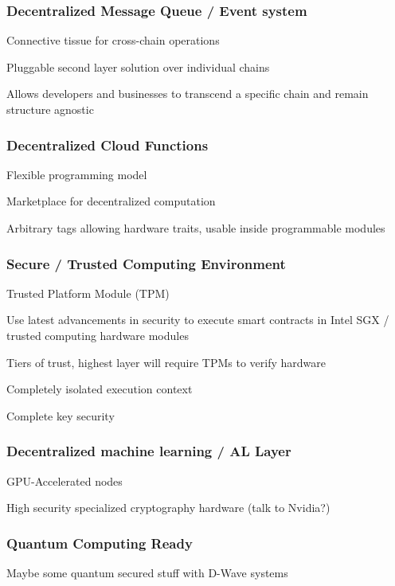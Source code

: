 \documentclass[11pt]{article}
\begin{document}
\subsubsection{Decentralized Message Queue / Event system}

Connective tissue for cross-chain operations


Pluggable second layer solution over individual chains


Allows developers and businesses to transcend a specific chain and remain structure agnostic


\subsubsection{Decentralized Cloud Functions}

Flexible programming model


Marketplace for decentralized computation


Arbitrary tags allowing hardware traits, usable inside programmable modules


\subsubsection{Secure / Trusted Computing Environment}

Trusted Platform Module (TPM)


Use latest advancements in security to execute smart contracts in Intel SGX / trusted computing hardware modules


Tiers of trust, highest layer will require TPMs to verify hardware


Completely isolated execution context


Complete key security


\subsubsection{Decentralized machine learning / AL Layer}

GPU-Accelerated nodes


High security specialized cryptography hardware (talk to Nvidia?)


\subsubsection{Quantum Computing Ready}

Maybe some quantum secured stuff with D-Wave systems
\end{document}
